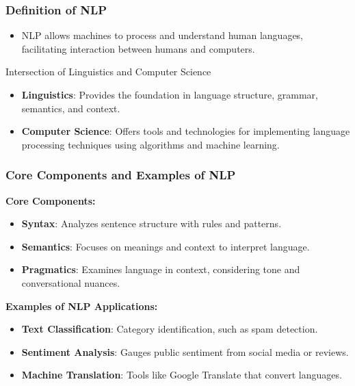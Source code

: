 \documentclass[aspectratio=169]{beamer}
\begin{document}
\begin{frame}[fragile]
    \frametitle{Definition of NLP}
    
    \begin{itemize}
        \item NLP allows machines to process and understand human languages, facilitating interaction between humans and computers.
    \end{itemize}
    
    \begin{block}{Intersection of Linguistics and Computer Science}
        \begin{itemize}
            \item \textbf{Linguistics}: Provides the foundation in language structure, grammar, semantics, and context.
            \item \textbf{Computer Science}: Offers tools and technologies for implementing language processing techniques using algorithms and machine learning.
        \end{itemize}
    \end{block}
\end{frame}

\begin{frame}[fragile]
    \frametitle{Core Components and Examples of NLP}
    
    \textbf{Core Components:}
    \begin{itemize}
        \item \textbf{Syntax}: Analyzes sentence structure with rules and patterns.
        \item \textbf{Semantics}: Focuses on meanings and context to interpret language.
        \item \textbf{Pragmatics}: Examines language in context, considering tone and conversational nuances.
    \end{itemize}
    
    \textbf{Examples of NLP Applications:}
    \begin{itemize}
        \item \textbf{Text Classification}: Category identification, such as spam detection.
        \item \textbf{Sentiment Analysis}: Gauges public sentiment from social media or reviews.
        \item \textbf{Machine Translation}: Tools like Google Translate that convert languages.
    \end{itemize}
\end{frame}
\end{document}
